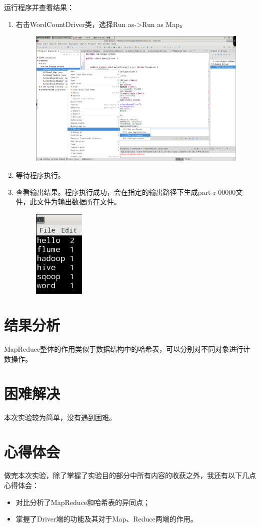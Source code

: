 \documentclass {article}
\begin{document}
				运行程序并查看结果：
				\begin{enumerate}
					\item 右击WordCountDriver类，选择Run as->Run as Map。
					\begin{figure}[H]
						\centering
						\includegraphics[width=4.5in]{figures/fig14.png}
					\end{figure}
				
					\item 等待程序执行。
					\item 查看输出结果。程序执行成功，会在指定的输出路径下生成part-r-00000文件，此文件为输出数据所在文件。
					\begin{figure}[H]
						\centering
						\includegraphics{figures/fig15.png}
					\end{figure}
				\end{enumerate}
			
	\section{结果分析}
		MapReduce整体的作用类似于数据结构中的哈希表，可以分别对不同对象进行计数操作。
	
	\section{困难解决}
		本次实验较为简单，没有遇到困难。
	
	\section{心得体会}
		做完本次实验，除了掌握了实验目的部分中所有内容的收获之外，我还有以下几点心得体会：
		\begin{itemize}
			\item 对比分析了MapReduce和哈希表的异同点；
			\item 掌握了Driver端的功能及其对于Map、Reduce两端的作用。
		\end{itemize}
	
\end{document}
